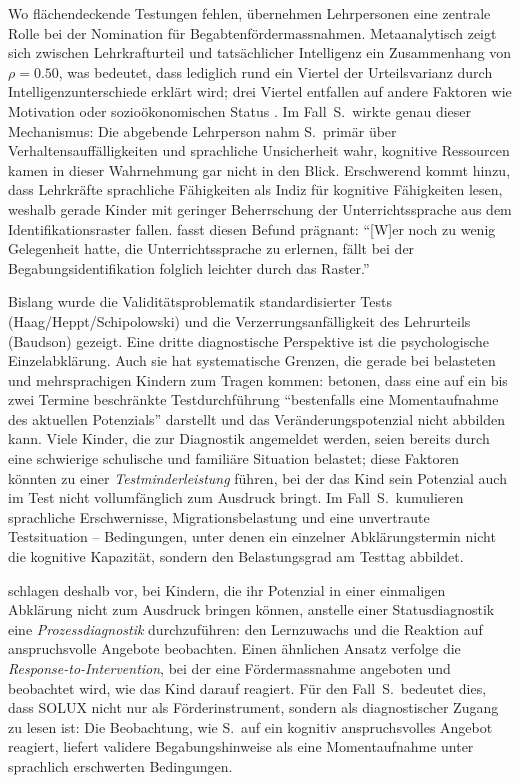 \documentclass[ngerman, a4paper]{article}
\begin{document}
Wo flächendeckende Testungen fehlen, übernehmen Lehrpersonen eine zentrale
Rolle bei der Nomination für Begabtenfördermassnahmen. Metaanalytisch zeigt
sich zwischen Lehrkrafturteil und tatsächlicher Intelligenz ein Zusammenhang
von $\rho = 0.50$, was bedeutet, dass lediglich rund ein Viertel der
Urteilsvarianz durch Intelligenzunterschiede erklärt wird; drei Viertel
entfallen auf andere Faktoren wie Motivation oder sozioökonomischen Status
\parencite[S.\,118]{baudson2021wasdenken}. Im Fall~S.\ wirkte genau dieser
Mechanismus: Die abgebende Lehrperson nahm S.\ primär über
Verhaltensauffälligkeiten und sprachliche Unsicherheit wahr, kognitive
Ressourcen kamen in dieser Wahrnehmung gar nicht in den Blick. Erschwerend
kommt hinzu, dass Lehrkräfte sprachliche Fähigkeiten als Indiz für kognitive
Fähigkeiten lesen, weshalb gerade Kinder mit geringer Beherrschung der
Unterrichtssprache aus dem Identifikationsraster fallen.
\textcite[S.\,120]{baudson2021wasdenken} fasst diesen Befund prägnant:
\enquote{[W]er noch zu wenig Gelegenheit hatte, die Unterrichtssprache zu
erlernen, fällt bei der Begabungsidentifikation folglich leichter durch das
Raster.}

Bislang wurde die Validitätsproblematik standardisierter Tests
(Haag/Heppt/Schipolowski) und die Verzerrungsanfälligkeit des Lehrurteils
(Baudson) gezeigt. Eine dritte diagnostische Perspektive ist die
psychologische Einzelabklärung. Auch sie hat systematische Grenzen, die
gerade bei belasteten und mehrsprachigen Kindern zum Tragen kommen:
\textcite[S.\,239--251]{gauckreimann2021psychdiagnostik} betonen, dass eine
auf ein bis zwei Termine beschränkte Testdurchführung \enquote{bestenfalls
eine Momentaufnahme des aktuellen Potenzials} darstellt und das
Veränderungspotenzial nicht abbilden kann. Viele Kinder, die zur Diagnostik
angemeldet werden, seien bereits durch eine schwierige schulische und
familiäre Situation belastet; diese Faktoren könnten zu einer
\textit{Testminderleistung} führen, bei der das Kind sein Potenzial auch im
Test nicht vollumfänglich zum Ausdruck bringt. Im Fall~S.\ kumulieren
sprachliche Erschwernisse, Migrations\-belastung und eine unvertraute
Testsituation -- Bedingungen, unter denen ein einzelner Abklärungstermin
nicht die kognitive Kapazität, sondern den Belastungsgrad am Testtag
abbildet.

\textcite[S.\,239--251]{gauckreimann2021psychdiagnostik} schlagen deshalb
vor, bei Kindern, die ihr Potenzial in einer einmaligen Abklärung nicht zum
Ausdruck bringen können, anstelle einer Statusdiagnostik eine
\textit{Prozessdiagnostik} durchzuführen: den Lernzuwachs und die Reaktion
auf anspruchsvolle Angebote beobachten. Einen ähnlichen Ansatz verfolge die
\textit{Response-to-Intervention}, bei der eine Fördermassnahme angeboten
und beobachtet wird, wie das Kind darauf reagiert. Für den Fall~S.\ bedeutet
dies, dass SOLUX nicht nur als Förderinstrument, sondern als diagnostischer
Zugang zu lesen ist: Die Beobachtung, wie S.\ auf ein kognitiv
anspruchsvolles Angebot reagiert, liefert validere Begabungshinweise als
eine Momentaufnahme unter sprachlich erschwerten Bedingungen.
\end{document}
